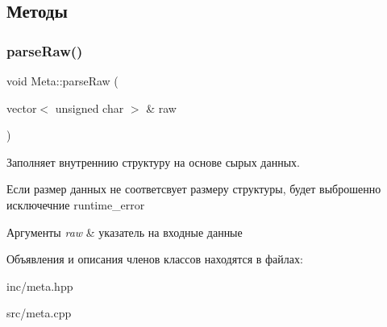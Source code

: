 \subsection{Методы}
\mbox{\label{classMeta_a75ca6d184c5d5af3148f7657ba6671e4}} 
\subsubsection{\texorpdfstring{parse\+Raw()}{parseRaw()}}
{\footnotesize\ttfamily void Meta\+::parse\+Raw (\begin{DoxyParamCaption}\item[{vector$<$ unsigned char $>$ \&}]{raw }\end{DoxyParamCaption})}



Заполняет внутреннию структуру на основе сырых данных. 

Если размер данных не соответсвует размеру структуры, будет выброшенно исключечние runtime\+\_\+error 
\begin{DoxyParams}{Аргументы}
{\em raw} & указатель на входные данные \\
\hline
\end{DoxyParams}


Объявления и описания членов классов находятся в файлах\+:\begin{DoxyCompactItemize}
\item 
inc/meta.\+hpp\item 
src/meta.\+cpp\end{DoxyCompactItemize}

